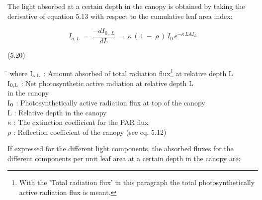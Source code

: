 \documentclass[11pt]{article}
\begin{document}
\bigskip
\bigskip
{}The light absorbed at a certain depth in the canopy is obtained by taking the derivative of
equation 5.13 with respect to the cumulative leaf area index:

\begin{displaymath}
I _{a,L} ~=~{\frac{-dI _{0\, ,\, L} }{dL}} ~=~ \kappa \, (\, 1~-~ \rho \, )\, I _{0} \, e ^{- \kappa \, LAI _{L} }
\end{displaymath}

 \bigskip
\strut\hfill (5.20)

\nwln
\begin{tabbing}
\hspace{1.27cm}\=\hspace{1.27cm}\=\hspace{1.27cm}\=\hspace{1.27cm}\=%
\hspace{1.27cm}\=\hspace{1.27cm}\=\hspace{1.27cm}\=\hspace{1.27cm}\=%
\hspace{1.27cm}\=\hspace{1.27cm}\=\kill
where\> I$_{{\rm a,L}}$\> : Amount absorbed of total radia\-tion flux\footnote{With the 'Total radiation flux' in this paragraph the total photosyntheti\-cally active radiation flux is meant.} at relative depth L\> \> \> \> \> \> \> \> [J m$^{{\rm -2}}$ s$^{{\rm -1}}$]\\
\>I$_{{\rm 0,L}}$\> : Net photosynthetic active radiation at relative depth L \\
\>\>   in the canopy\> \> \> \> \> \> \> \> [J m$^{{\rm -2}}$ s$^{{\rm -1}}$]\\
\>I$_{{\rm 0}}$\> : Photosynthetically active radia\-tion flux at top of the canopy\> \> \> \> \> \> \> \> [J m$^{{\rm -2}}$ s$^{{\rm -1}}$]\\
\>L\> : Relative depth in the canopy\> \> \> \> \> \> \> \> [-]\\
\>$\kappa$\> : The extinction coefficient for the PAR flux \> \> \> \> \> \> \> \> [-]\\
\>$\rho$\> : Reflection coefficient of the canopy (see eq. 5.12)\> \> \> \> \> \> \> \> [-]
\end{tabbing}

\bigskip
\bigskip
\bigskip
\bigskip
\bigskip
 If expressed for the different light components, the absorbed fluxes for the different
components per unit leaf area at a certain depth in the canopy are:
\end{document}
